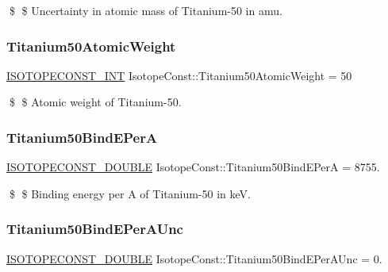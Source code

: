 \$ \$ Uncertainty in atomic mass of Titanium-\/50 in amu. \mbox{\label{group___isotope_const-_titanium-_ti50_gadd63620f8c7891c59cfa0c38a936ea76}} 
\subsubsection{\texorpdfstring{Titanium50\+Atomic\+Weight}{Titanium50AtomicWeight}}
{\footnotesize\ttfamily \mbox{\hyperlink{group___isotope_const-_macros_ga5f18360b3e99483a35c32d789e62621c}{I\+S\+O\+T\+O\+P\+E\+C\+O\+N\+S\+T\+\_\+\+I\+NT}} Isotope\+Const\+::\+Titanium50\+Atomic\+Weight = 50}

\$ \$ Atomic weight of Titanium-\/50. \mbox{\label{group___isotope_const-_titanium-_ti50_ga6d8f3102589cbb55084c37d623fc91e5}} 
\subsubsection{\texorpdfstring{Titanium50\+Bind\+E\+PerA}{Titanium50BindEPerA}}
{\footnotesize\ttfamily \mbox{\hyperlink{group___isotope_const-_macros_ga8f45a7272ce02c0b4c65c44636ed719a}{I\+S\+O\+T\+O\+P\+E\+C\+O\+N\+S\+T\+\_\+\+D\+O\+U\+B\+LE}} Isotope\+Const\+::\+Titanium50\+Bind\+E\+PerA = 8755.}

\$ \$ Binding energy per A of Titanium-\/50 in keV. \mbox{\label{group___isotope_const-_titanium-_ti50_ga466cc590b383e6374a26f2009abc42b9}} 
\subsubsection{\texorpdfstring{Titanium50\+Bind\+E\+Per\+A\+Unc}{Titanium50BindEPerAUnc}}
{\footnotesize\ttfamily \mbox{\hyperlink{group___isotope_const-_macros_ga8f45a7272ce02c0b4c65c44636ed719a}{I\+S\+O\+T\+O\+P\+E\+C\+O\+N\+S\+T\+\_\+\+D\+O\+U\+B\+LE}} Isotope\+Const\+::\+Titanium50\+Bind\+E\+Per\+A\+Unc = 0.}

